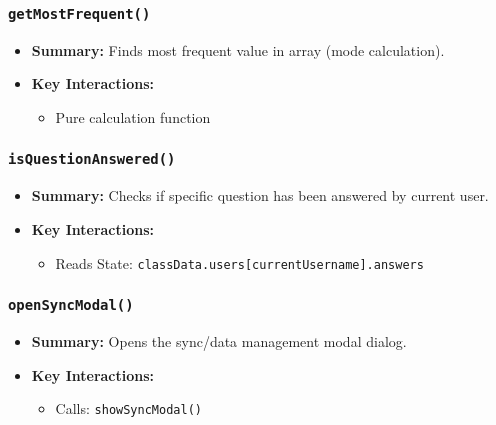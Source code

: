 \documentclass[11pt,letterpaper]{article}
\begin{document}
\subsubsection{\texttt{getMostFrequent()}}
\begin{itemize}
    \item \textbf{Summary:} Finds most frequent value in array (mode calculation).
    \item \textbf{Key Interactions:}
    \begin{itemize}
        \item Pure calculation function
    \end{itemize}
\end{itemize}

\subsubsection{\texttt{isQuestionAnswered()}}
\begin{itemize}
    \item \textbf{Summary:} Checks if specific question has been answered by current user.
    \item \textbf{Key Interactions:}
    \begin{itemize}
        \item Reads State: \texttt{classData.users[currentUsername].answers}
    \end{itemize}
\end{itemize}

\subsubsection{\texttt{openSyncModal()}}
\begin{itemize}
    \item \textbf{Summary:} Opens the sync/data management modal dialog.
    \item \textbf{Key Interactions:}
    \begin{itemize}
        \item Calls: \texttt{showSyncModal()}
    \end{itemize}
\end{itemize}
\end{document}
